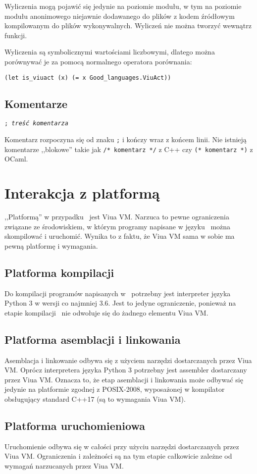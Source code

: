 Wyliczenia mogą pojawić się jedynie na poziomie modułu, w tym na poziomie modułu anonimowego niejawnie
dodawanego do plików z kodem źródłowym kompilowanym do plików wykonywalnych. Wyliczeń nie można tworzyć
wewnątrz funkcji.

Wyliczenia są symbolicznymi wartościami liczbowymi, dlatego można porównywać je
za pomocą normalnego operatora porównania:

\begin{lstlisting}
(let is_viuact (x) (= x Good_languages.ViuAct))
\end{lstlisting}

\subsection{Komentarze}

\texttt{; \emph{treść komentarza}}
\newline

Komentarz rozpoczyna się od znaku \texttt{;} i kończy wraz z końcem linii.
Nie istnieją komentarze ,,blokowe'' takie jak \texttt{/* komentarz */} z C++ czy
\texttt{(* komentarz *)} z OCaml.



\section{Interakcja z platformą}

,,Platformą'' w przypadku \ViuAct\ jest Viua VM. Narzuca to pewne ograniczenia związane ze środowiskiem, w
którym programy napisane w języku \ViuAct\ można skompilować i uruchomić. Wynika to z faktu, że Viua VM sama w
sobie ma pewną platformę i wymagania.

\subsection{Platforma kompilacji}

Do kompilacji programów napisanych w \ViuAct\ potrzebny jest interpreter języka Python 3 w wersji co najmniej
3.6. Jest to jedyne ograniczenie, ponieważ na etapie kompilacji \ViuAct\ nie odwołuje się do żadnego elementu
Viua VM.

\subsection{Platforma asemblacji i linkowania}

Asemblacja i linkowanie odbywa się z użyciem narzędzi dostarczanych przez Viua VM.
Oprócz interpretera języka Python 3 potrzebny jest assembler dostarczany przez Viua VM. Oznacza to, że etap
asemblacji i linkowania może odbywać się jedynie na platformie zgodnej z POSIX-2008, wyposażonej w kompilator
obsługujący standard C++17 (są to wymagania Viua VM).

\subsection{Platforma uruchomieniowa}

Uruchomienie odbywa się w całości przy użyciu narzędzi dostarczanych przez Viua VM.
Ograniczenia i zależności są na tym etapie całkowicie zależne od wymagań narzucanych przez Viua VM.
